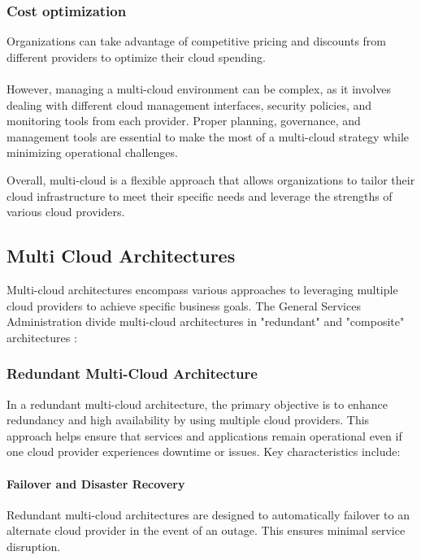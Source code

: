 \subsubsection{Cost optimization}
Organizations can take advantage of competitive pricing and 
discounts from different providers to optimize their cloud spending.\\
\\

However, managing a multi-cloud environment can be complex, as it involves dealing with different cloud management
interfaces, security policies, and monitoring tools from each provider. Proper planning, governance, and management tools are 
essential to make the most of a multi-cloud strategy while minimizing operational challenges.

Overall, multi-cloud is a flexible approach that allows organizations to tailor their cloud infrastructure to meet 
their specific needs and leverage the strengths of various cloud providers.

\subsection{Multi Cloud Architectures}


Multi-cloud architectures encompass various approaches to leveraging multiple cloud providers to achieve specific business goals. 
The General Services Administration\cite{MultiCloudHybridCloud} divide multi-cloud architectures in "redundant" and "composite" architectures :

\subsubsection{Redundant Multi-Cloud Architecture}

In a redundant multi-cloud architecture, the primary objective is to enhance redundancy and high availability by using multiple cloud providers. 
This approach helps ensure that services and applications remain operational even if one cloud provider experiences downtime or issues. 
Key characteristics include:

\paragraph{Failover and Disaster Recovery}
Redundant multi-cloud architectures are designed to automatically failover to an alternate cloud provider in the event of an outage. 
This ensures minimal service disruption.

